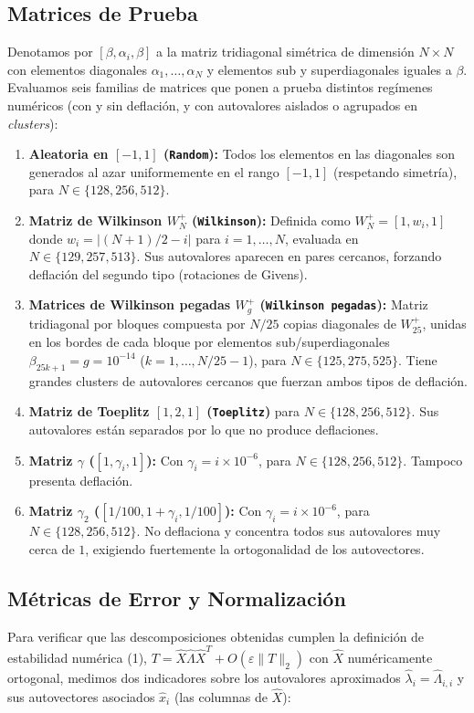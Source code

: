 \documentclass[11pt,a4paper]{article}
\begin{document}
\subsection{Matrices de Prueba}
Denotamos por $[\beta, \alpha_i, \beta]$ a la matriz tridiagonal simétrica de dimensión $N \times N$ con elementos diagonales $\alpha_1, \dots, \alpha_N$ y elementos sub y superdiagonales iguales a $\beta$. Evaluamos seis familias de matrices que ponen a prueba distintos regímenes numéricos (con y sin deflación, y con autovalores aislados o agrupados en \textit{clusters}):
\begin{enumerate}
    \item \textbf{Aleatoria en $[-1, 1]$ (\texttt{Random}):} Todos los elementos en las diagonales son generados al azar uniformemente en el rango $[-1, 1]$ (respetando simetría), para $N \in \{128, 256, 512\}$.
    \item \textbf{Matriz de Wilkinson $W_N^+$ (\texttt{Wilkinson}):} Definida como $W_N^+ = [1, w_i, 1]$ donde $w_i = |(N+1)/2 - i|$ para $i = 1, \dots, N$, evaluada en $N \in \{129, 257, 513\}$. Sus autovalores aparecen en pares cercanos, forzando deflación del segundo tipo (rotaciones de Givens).
    \item \textbf{Matrices de Wilkinson pegadas $W_g^+$ (\texttt{Wilkinson pegadas}):} Matriz tridiagonal por bloques compuesta por $N/25$ copias diagonales de $W_{25}^+$, unidas en los bordes de cada bloque por elementos sub/superdiagonales $\beta_{25k+1} = g = 10^{-14}$ ($k = 1, \dots, N/25 - 1$), para $N \in \{125, 275, 525\}$. Tiene grandes clusters de autovalores cercanos que fuerzan ambos tipos de deflación.
    \item \textbf{Matriz de Toeplitz $[1, 2, 1]$ (\texttt{Toeplitz})} para $N \in \{128, 256, 512\}$. Sus autovalores están separados por lo que no produce deflaciones.
    \item \textbf{Matriz $\gamma$ ($[1, \gamma_i, 1]$):} Con $\gamma_i = i \times 10^{-6}$, para $N \in \{128, 256, 512\}$. Tampoco presenta deflación.
    \item \textbf{Matriz $\gamma_2$ ($[1/100, 1 + \gamma_i, 1/100]$):} Con $\gamma_i = i \times 10^{-6}$, para $N \in \{128, 256, 512\}$. No deflaciona y concentra todos sus autovalores muy cerca de $1$, exigiendo fuertemente la ortogonalidad de los autovectores.
\end{enumerate}

\subsection{Métricas de Error y Normalización}
Para verificar que las descomposiciones obtenidas cumplen la definición de estabilidad numérica (1), $T = \hat{X}\hat{\Lambda}\hat{X}^T + O(\varepsilon \|T\|_2)$ con $\hat{X}$ numéricamente ortogonal, medimos dos indicadores sobre los autovalores aproximados $\hat{\lambda}_i = \hat{\Lambda}_{i,i}$ y sus autovectores asociados $\hat{x}_i$ (las columnas de $\hat{X}$):
\end{document}
